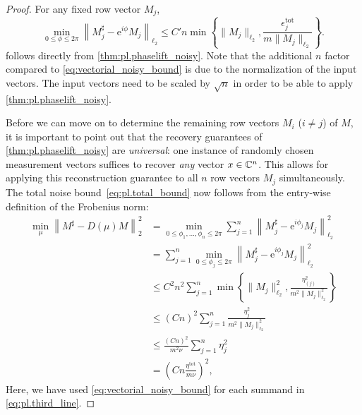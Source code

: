 \begin{proof}
  For any fixed row vector ${M}_j$,
  \[
    \min_{0 \leq \phi \leq 2 \pi}\left\| {M}_j^\sharp - \mathrm{e}^{i \phi} {M}_j \right\|_{\ell_2} \leq C' n \min
    \left\{
    \| {M}_j \|_{\ell_2}, \frac{ \epsilon_j^{\mathrm{tot}}}{m \| {M}_j \|_{\ell_2}}
    \right\}.
    \label{eq:noisy_reconstruction_vectorial_bound}
  \]
  follows directly from \cref{thm:pl.phaselift_noisy}.
  Note that the additional $n$ factor compared to \cref{eq:vectorial_noisy_bound} is due to the normalization of the input vectors.
  The input vectors need to be scaled by $\sqrt{n}$ in order to be able to apply \cref{thm:pl.phaselift_noisy}.

  Before we can move on to determine the remaining row vectors ${M}_{i}$ ($i \neq j$) of ${M}$, it is important to point out that the recovery guarantees of \cref{thm:pl.phaselift_noisy} are \emph{universal}: one instance of randomly chosen measurement vectors suffices to recover \emph{any} vector ${x} \in {\mathbb{C}}^n$.
  This allows for applying this reconstruction guarantee to all $n$ row vectors ${M}_j$ simultaneously.
  The total noise bound~\eqref{eq:pl.total_bound} now follows from the entry-wise definition of the Frobenius norm:
  \begin{align}
    \min_{{\mu}}\left\|  {M}^\sharp -  {D} ({\mu}) {M} \right\|_2 ^2
    &= \min_{0 \leq \phi_1,\ldots,\phi_n \leq 2 \pi}
    \sum_{j=1}^n \left\| {M}_j^\sharp - \mathrm{e}^{i \phi_j} {M}_j \right\|_{\ell_2}^2 \\
    &= \sum_{j=1}^n \min_{0 \leq \phi_j \leq 2 \pi} \left\| {M}_j^\sharp - \mathrm{e}^{i \phi_j} {M}_j \right\|_{\ell_2}^2 \\
    \label{eq:pl.third_line}
    & \leq C^2 n^2 \sum_{j=1}^n  \min \left\{ \| {M}_j \|_{\ell_2}^2, \frac{ \eta_{(j)}^2}{m^2 \|{M}_j \|_{\ell_2}^2} \right\} \\
    &\leq \left(C n\right)^2 \sum_{j=1}^n \frac{\eta_{j}^2}{m^2 \|{M}_j \|_{\ell_2}^2} \\
    & \leq \frac{\left(Cn \right)^2}{m^2 \nu} \sum_{j=1}^n \eta_{j}^2 \\
    &= \left( C n \frac{\eta^{\mathrm{tot}}}{m \nu} \right)^2,
  \end{align}
  Here, we have used \cref{eq:vectorial_noisy_bound} for each summand in \cref{eq:pl.third_line}.
\end{proof}


